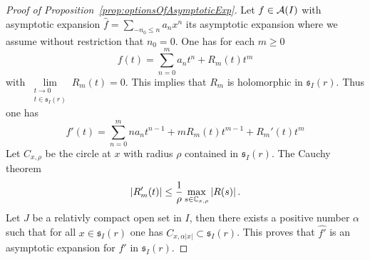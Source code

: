 \begin{proof}[Proof of Proposition~\ref{prop:optionsOfAsymptoticExp}]
  Let $f\in\mathcal{A}(I)$ with asymptotic expansion $\hat f=\sum_{-n_0\leq n}a_nx^n$
  its asymptotic expansion where we assume without restriction that $n_0=0$.
  One has for each $m\geq0$
  \[
    f(t)=\sum_{n=0}^ma_nt^n+R_m(t)t^m
  \]
  with $\underset{\substack{t\to0\\t\in\mathfrak{s}_I(r)}}{\lim}R_m(t)=0$.
  This implies that $R_m$ is holomorphic in $\mathfrak{s}_I(r)$.
  Thus one has
  \[
    f'(t)=\sum_{n=0}^mna_nt^{n-1}+mR_m(t)t^{m-1}+R_m'(t)t^m
  \]
  Let $C_{x,\rho}$ be the circle at $x$ with radius $\rho$ contained in
  $\mathfrak{s}_I(r)$. The Cauchy theorem 
  \[
    |R_m'(t)|\leq\frac{1}{\rho}\max_{s\in\mathbb{C}_{x,\rho}}|R(s)| \,.
  \]
  Let $J$ be a relativly compact open set in $I$, then there exists a positive
  number $\alpha$ such that for all $x\in\mathfrak{s}_I(r)$ one has
  $C_{x,\alpha|x|}\subset\mathfrak{s}_I(r)$.
  \TODO{}
  This proves that $\hat{f'}$ is an asymptotic expansion for $f'$ in
  $\mathfrak{s}_I(r)$.
\end{proof}

